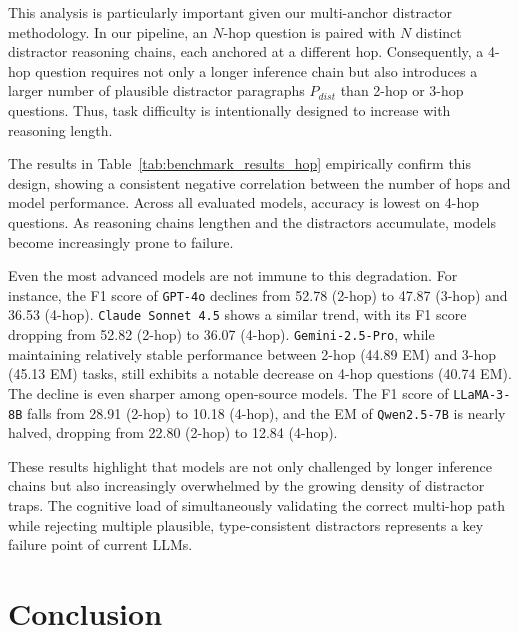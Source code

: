 \documentclass[10pt, a4paper]{article}
\begin{document}
This analysis is particularly important given our multi-anchor distractor methodology. In our pipeline, an $N$-hop question is paired with $N$ distinct distractor reasoning chains, each anchored at a different hop. Consequently, a 4-hop question requires not only a longer inference chain but also introduces a larger number of plausible distractor paragraphs $P_{dist}$ than 2-hop or 3-hop questions. Thus, task difficulty is intentionally designed to increase with reasoning length.

The results in Table~\ref{tab:benchmark_results_hop} empirically confirm this design, showing a consistent negative correlation between the number of hops and model performance. Across all evaluated models, accuracy is lowest on 4-hop questions. As reasoning chains lengthen and the distractors accumulate, models become increasingly prone to failure.

Even the most advanced models are not immune to this degradation. For instance, the F1 score of \texttt{GPT-4o} declines from 52.78 (2-hop) to 47.87 (3-hop) and 36.53 (4-hop). \texttt{Claude Sonnet 4.5} shows a similar trend, with its F1 score dropping from 52.82 (2-hop) to 36.07 (4-hop). \texttt{Gemini-2.5-Pro}, while maintaining relatively stable performance between 2-hop (44.89 EM) and 3-hop (45.13 EM) tasks, still exhibits a notable decrease on 4-hop questions (40.74 EM). The decline is even sharper among open-source models. The F1 score of \texttt{LLaMA-3-8B} falls from 28.91 (2-hop) to 10.18 (4-hop), and the EM of \texttt{Qwen2.5-7B} is nearly halved, dropping from 22.80 (2-hop) to 12.84 (4-hop).

These results highlight that models are not only challenged by longer inference chains but also increasingly overwhelmed by the growing density of distractor traps. The cognitive load of simultaneously validating the correct multi-hop path while rejecting multiple plausible, type-consistent distractors represents a key failure point of current LLMs.

\section{Conclusion}
\end{document}
